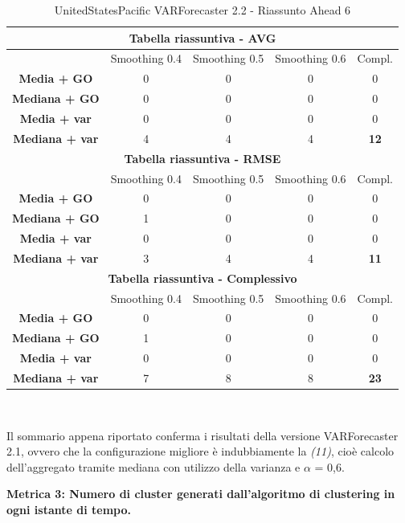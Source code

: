 \documentclass[12pt,a4paper,oneside,openright]{book}
\begin{document}
\medskip
\begin{table}[H]
\centering
\begin{tabular}{|c|c|c|c|c|}
\hline
\multicolumn{5}{|c|}{\textbf{Tabella riassuntiva - AVG}} \\
\hline
& Smoothing 0.4 & Smoothing 0.5 & Smoothing 0.6 & Compl.\\
\hline
\textbf{Media + GO} & 0 & 0 & 0 & 0\\ 
\hline
\textbf{Mediana + GO} & 0 & 0 & 0 & 0\\ 
\hline
\textbf{Media + var} & 0 & 0 & 0 & 0\\  
\hline
\textbf{Mediana + var} & 4 & 4 & 4 & \textbf{12}\\ 
\hline
\multicolumn{5}{|c|}{\textbf{Tabella riassuntiva - RMSE}} \\
\hline
& Smoothing 0.4 & Smoothing 0.5 & Smoothing 0.6 & Compl.\\
\hline
\textbf{Media + GO} & 0 & 0 & 0 & 0\\ 
\hline
\textbf{Mediana + GO} & 1 & 0 & 0 & 0\\ 
\hline
\textbf{Media + var} & 0 & 0 & 0 & 0\\ 
\hline
\textbf{Mediana + var} & 3 & 4 & 4 & \textbf{11}\\ 
\hline
\multicolumn{5}{|c|}{\textbf{Tabella riassuntiva - Complessivo}} \\
\hline
& Smoothing 0.4 & Smoothing 0.5 & Smoothing 0.6 & Compl.\\
\hline
\textbf{Media + GO} & 0 & 0 & 0 & 0\\  
\hline
\textbf{Mediana + GO} & 1 & 0 & 0 & 0\\ 
\hline
\textbf{Media + var} & 0 & 0 & 0 & 0\\  
\hline
\textbf{Mediana + var} & 7 & 8 & 8 & \textbf{23}\\ 
\hline
\end{tabular} \\ 
\caption{UnitedStatesPacific VARForecaster 2.2 - Riassunto Ahead 6}
\end{table}

Il sommario appena riportato conferma i risultati della versione VARForecaster 2.1, ovvero che la configurazione migliore è indubbiamente la \textit{(11)}, cioè calcolo dell'aggregato tramite mediana con utilizzo della varianza e $\alpha$ = 0,6.

\medskip

\textbf{Metrica 3: Numero di cluster generati dall'algoritmo di clustering in ogni istante di tempo.}
\end{document}
